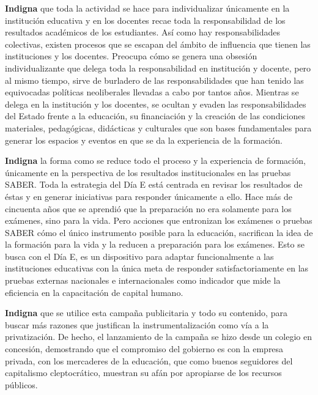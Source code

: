 \documentclass[10pt]{article}
\begin{document}
\textbf{Indigna} que toda la actividad se hace para individualizar únicamente en la institución educativa y en los docentes recae toda la responsabilidad de los resultados académicos de los estudiantes. Así como hay responsabilidades colectivas, existen procesos que se escapan del ámbito de influencia que tienen las instituciones y los docentes. Preocupa cómo se genera una obsesión individualizante que delega toda la responsabilidad en institución y docente, pero al mismo tiempo, sirve de burladero de las responsabilidades que han tenido las equivocadas políticas neoliberales llevadas a cabo por tantos años. Mientras se delega en la institución y los docentes, se ocultan y evaden las responsabilidades del Estado frente a la educación, su financiación y la creación de las condiciones materiales, pedagógicas, didácticas y culturales que son bases fundamentales para generar los espacios y eventos en que se da la experiencia de la formación.

\textbf{Indigna} la forma como se reduce todo el proceso y la experiencia de formación, únicamente en la perspectiva de los resultados institucionales en las pruebas SABER. Toda la estrategia del Día E está centrada en revisar los resultados de éstas y en generar iniciativas para responder únicamente a ello. Hace más de cincuenta años que se aprendió que la preparación no era solamente para los exámenes, sino para la vida. Pero acciones que entronizan los exámenes o pruebas SABER cómo el único instrumento posible para la educación, sacrifican la idea de la formación para la vida y la reducen a preparación para los exámenes. Esto se busca con el Día E, es un dispositivo para adaptar funcionalmente a las instituciones educativas con la única meta de responder satisfactoriamente en las pruebas externas nacionales e internacionales como indicador que mide la eficiencia en la capacitación de capital humano.

\textbf{Indigna} que se utilice esta campaña publicitaria y todo su contenido, para buscar más razones que justifican la instrumentalización como vía a la privatización. De hecho, el
lanzamiento de la campaña se hizo desde un colegio en concesión, demostrando que el compromiso del gobierno es con la empresa privada, con los mercaderes de la educación, que como buenos seguidores del capitalismo cleptocrático, muestran su afán por apropiarse de los recursos públicos.
\end{document}
